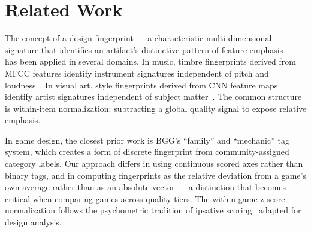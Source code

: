 \section{Related Work}
\label{sec:related}

The concept of a design fingerprint --- a characteristic multi-dimensional signature that
identifies an artifact's distinctive pattern of feature emphasis --- has been applied
in several domains. In music, timbre fingerprints derived from MFCC features identify
instrument signatures independent of pitch and loudness~\cite{aucouturier2003music}.
In visual art, style fingerprints derived from CNN feature maps identify artist signatures
independent of subject matter~\cite{gatys2016image}. The common structure is within-item
normalization: subtracting a global quality signal to expose relative emphasis.

In game design, the closest prior work is BGG's ``family'' and ``mechanic'' tag system,
which creates a form of discrete fingerprint from community-assigned category labels.
Our approach differs in using continuous scored axes rather than binary tags, and in
computing fingerprints as the relative deviation from a game's own average rather than
as an absolute vector --- a distinction that becomes critical when comparing games across
quality tiers. The within-game z-score normalization follows the psychometric tradition
of ipsative scoring~\cite{meade2004psychometric} adapted for design analysis.
